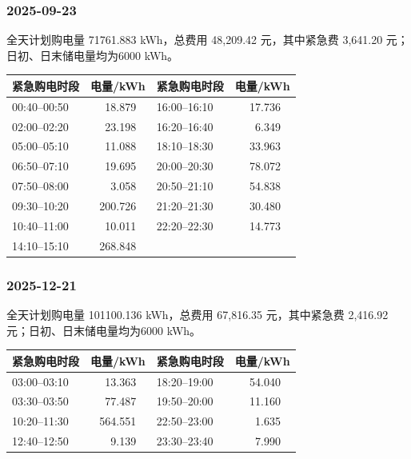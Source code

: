 \subsubsection*{2025-09-23}

\begin{center}\small\quad\end{center}
全天计划购电量 71761.883 kWh，总费用 48,209.42 元，其中紧急费 3,641.20 元；日初、日末储电量均为6000 kWh。
\begin{center}\small
\begin{tabular}{lrlr}\toprule
紧急购电时段 & 电量/kWh & 紧急购电时段 & 电量/kWh\\\midrule
00:40--00:50 & 18.879 \ & 16:00--16:10 & 17.736 \ \\
02:00--02:20 & 23.198 \ & 16:20--16:40 & 6.349 \ \\
05:00--05:10 & 11.088 \ & 18:10--18:30 & 33.963 \ \\
06:50--07:10 & 19.695 \ & 20:00--20:30 & 78.072 \ \\
07:50--08:00 & 3.058 \ & 20:50--21:10 & 54.838 \ \\
09:30--10:20 & 200.726 \ & 21:20--21:30 & 30.480 \ \\
10:40--11:00 & 10.011 \ & 22:20--22:30 & 14.773 \ \\
14:10--15:10 & 268.848 \ &  &  \\
\bottomrule\end{tabular}\end{center}

\subsubsection*{2025-12-21}

\begin{center}\small\quad\end{center}
全天计划购电量 101100.136 kWh，总费用 67,816.35 元，其中紧急费 2,416.92 元；日初、日末储电量均为6000 kWh。
\begin{center}\small
\begin{tabular}{lrlr}\toprule
紧急购电时段 & 电量/kWh & 紧急购电时段 & 电量/kWh\\\midrule
03:00--03:10 & 13.363 \ & 18:20--19:00 & 54.040 \ \\
03:30--03:50 & 77.487 \ & 19:50--20:00 & 11.160 \ \\
10:20--11:30 & 564.551 \ & 22:50--23:00 & 1.635 \ \\
12:40--12:50 & 9.139 \ & 23:30--23:40 & 7.990 \ \\
\bottomrule\end{tabular}\end{center}